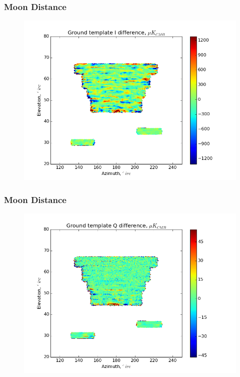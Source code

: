 \documentclass{beamer}
\begin{document}
\begin{frame}
\frametitle{Moon Distance}
\begin{figure}
\includegraphics[width=0.9\linewidth]{dI_gt_MOON_DIST.png}
\end{figure}
\end{frame}

\begin{frame}
\frametitle{Moon Distance}
\begin{figure}
\includegraphics[width=0.9\linewidth]{dQ_gt_MOON_DIST.png}
\end{figure}
\end{frame}
\end{document}
